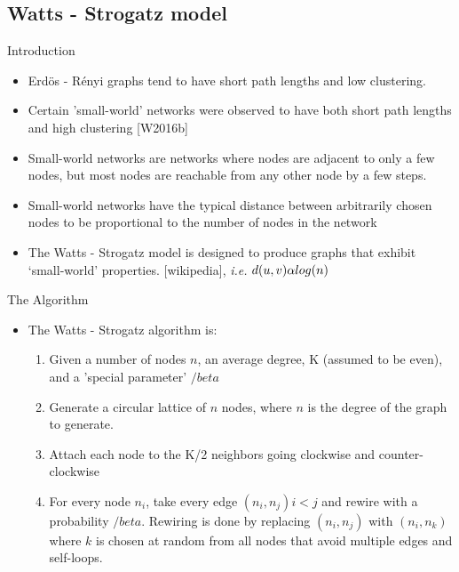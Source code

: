 \documentclass{beamer}
\begin{document}
\subsection{Watts - Strogatz model}
\begin{frame}{Introduction}
\begin{itemize}
\item Erd\"os - R\'enyi graphs tend to have short path lengths and low clustering.
\item Certain 'small-world' networks were observed to have both short path lengths and high clustering [W2016b]
\item Small-world networks are networks where nodes are adjacent to only a few nodes, but most nodes are reachable from any other node by a few steps.
\item Small-world networks have the typical distance between arbitrarily chosen nodes to be proportional to the number of nodes in the network
\item The Watts - Strogatz model is designed to produce graphs that exhibit `small-world' properties.
 [wikipedia], {\em i.e.} $d(u,v) \space \alpha log(n)$
\end{itemize}
\end{frame}

\begin{frame}{The Algorithm}
\begin{itemize}
\item The Watts - Strogatz algorithm is:
\begin{enumerate}
\item Given a number of nodes $n$, an average degree, K (assumed to be even), and a 'special parameter' $/beta$
\item Generate a circular lattice of $n$ nodes, where $n$ is the degree of the graph to generate.
\item Attach each node to the K/2 neighbors going clockwise and counter-clockwise
\item For every node $n_i$, take every edge $(n_i, n_j) i < j$ and rewire with a probability $/beta$.  Rewiring is done by replacing $(n_i, n_j)$ with $(n_i, n_k)$ where $k$ is chosen at random from all nodes that avoid multiple edges and self-loops.
\end{enumerate}
\end{itemize}
\end{frame}
\end{document}
